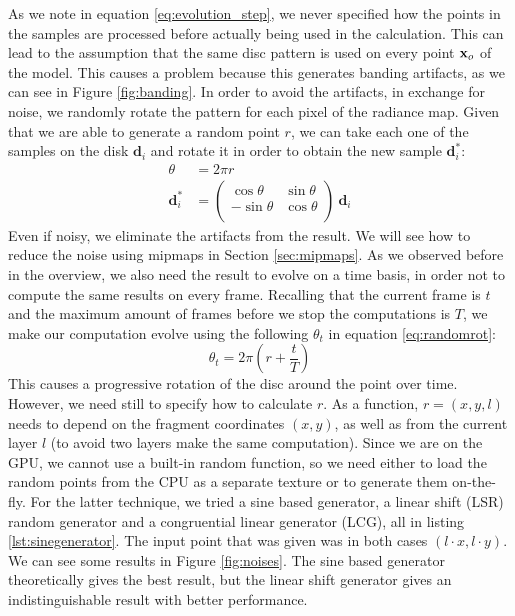 As we note in equation \ref{eq:evolution_step}, we never specified how the points in the samples are processed before actually being used in the calculation. This can lead to the assumption that the same disc pattern is used on every point $\mathbf{x}_o$ of the model. This causes a problem because this generates banding artifacts, as we can see in Figure \ref{fig:banding}. In order to avoid the artifacts, in exchange for noise, we randomly rotate the pattern for each pixel of the radiance map. Given that we are able to generate a random point $r$, we can take each one of the samples on the disk $\mathbf{d}_i$ and rotate it in order to obtain the new sample $\mathbf{d}_i^*$:
\renewcommand{\arraystretch}{1}
\begin{equation}
\begin{split}
\theta &= 2 \pi r \\
\mathbf{d}_i^* &= \left(\begin{array}{cc}
\cos\theta & \sin\theta \\
-\sin\theta & \cos\theta \\
\end{array} \right) \ \mathbf{d}_i
\end{split}
\label{eq:randomrot}
\end{equation}
\renewcommand{\arraystretch}{1.8}
Even if noisy, we eliminate the artifacts from the result. We will see how to reduce the noise using mipmaps in Section \ref{sec:mipmaps}. As we observed before in the overview, we also need the result to evolve on a time basis, in order not to compute the same results on every frame. Recalling that the current frame is $t$ and the maximum amount of frames before we stop the computations is $T$, we make our computation evolve using the following $\theta_t$ in equation \ref{eq:randomrot}:
$$
\theta_t = 2 \pi \left(r + \frac{t}{T}\right)
$$
This causes a progressive rotation of the disc around the point over time. However, we need still to specify how to calculate $r$. As a function, $r = (x,y,l)$ needs to depend on the fragment coordinates $(x,y)$, as well as from the current layer $l$ (to avoid two layers make the same computation). Since we are on the GPU, we cannot use a built-in random function, so we need either to load the random points from the CPU as a separate texture or to generate them on-the-fly. For the latter technique, we tried a sine based generator, a linear shift (LSR) random generator and a congruential linear generator (LCG), all in listing \ref{lst:sinegenerator}. The input point that was given was in both cases $(l \cdot x, l \cdot y)$. We can see some results in Figure \ref{fig:noises}. The sine based generator theoretically gives the best result, but the linear shift generator gives an indistinguishable result with better performance.

